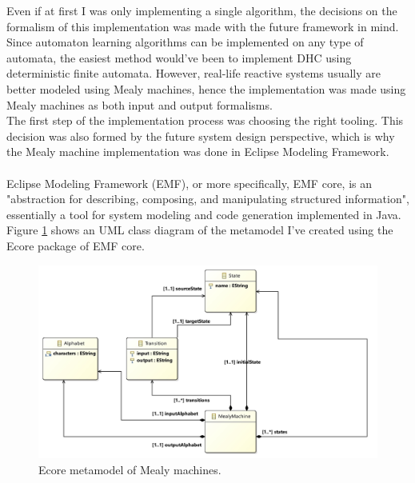 Even if at first I was only implementing a single algorithm, the decisions on the formalism of this implementation was made with the future framework in mind. Since automaton learning algorithms can be  implemented on any type of automata, the easiest method would've been to implement DHC using deterministic finite automata. However, real-life reactive systems usually are better modeled using Mealy machines, hence the implementation was made using Mealy machines as both input and output formalisms.
\\
The first step of the implementation process was choosing the right tooling. This decision was also formed by the future system design perspective, which is why the Mealy machine implementation was done in Eclipse Modeling Framework.
\\\\
Eclipse Modeling Framework (EMF), or more specifically, EMF core, is an "abstraction for describing, composing, and manipulating structured information", essentially a tool for system modeling and code generation implemented in Java. Figure \ref*{fig:mealyecore} shows an UML class diagram of the metamodel I've created using the Ecore package of EMF core. 

\begin{figure}
	\centering
	\includegraphics[width=1.0\linewidth]{figures/mealymodel}
	\caption{Ecore metamodel of Mealy machines.}
	\label{fig:mealyecore}
\end{figure}

